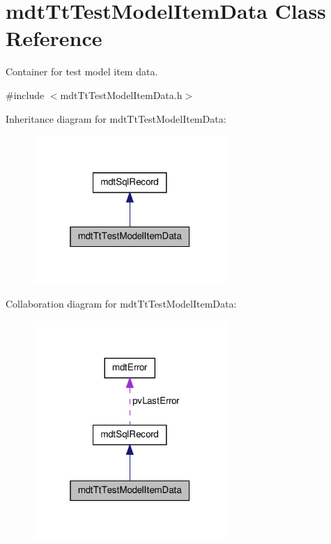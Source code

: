 \hypertarget{classmdt_tt_test_model_item_data}{\section{mdt\-Tt\-Test\-Model\-Item\-Data Class Reference}
\label{classmdt_tt_test_model_item_data}
}


Container for test model item data.  




{\ttfamily \#include $<$mdt\-Tt\-Test\-Model\-Item\-Data.\-h$>$}



Inheritance diagram for mdt\-Tt\-Test\-Model\-Item\-Data\-:
\nopagebreak
\begin{figure}[H]
\begin{center}
\leavevmode
\includegraphics[width=208pt]{classmdt_tt_test_model_item_data__inherit__graph}
\end{center}
\end{figure}


Collaboration diagram for mdt\-Tt\-Test\-Model\-Item\-Data\-:
\nopagebreak
\begin{figure}[H]
\begin{center}
\leavevmode
\includegraphics[width=208pt]{classmdt_tt_test_model_item_data__coll__graph}
\end{center}
\end{figure}
